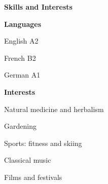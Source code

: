 \documentclass[a4paper,12pt,final]{memoir}
\newcommand{\Sep}{\vspace{1.5em}}
\newcommand{\SmallSep}{\vspace{0.5em}}
\newenvironment{Career Profile}
	{\ignorespaces\textbf{\color{ForestGreen} Career Profile}}
	{\Sep\ignorespacesafterend}
\newenvironment{Key experience}
	{\ignorespaces\textbf{\color{ForestGreen} Key experience}}
	{\Sep\ignorespacesafterend}
\newcommand{\CVSection}[1]
	{\Large\textbf{#1}\par
	\SmallSep\normalsize\normalfont}
\newcommand{\CVItem}[1]
	{\textbf{\color{ForestGreen} #1}}
\begin{document}
\CVSection{Skills and Interests}
\CVItem{Languages}
\begin{multicols}{3}
\begin{compactitem}[\color{ForestGreen}$\circ$]
	\item English A2
	\item French  B2
	\item German  A1
\end{compactitem}
\end{multicols}
\SmallSep

\CVItem{Interests}
\begin{multicols}{3}
\begin{compactitem}[\color{ForestGreen}$\circ$]
	\item Natural medicine and herbalism
	\item Gardening
	\item Sports: fitness and skiing 
	\item Classical music 
	\item Films and  festivals
\end{compactitem}
\end{multicols}
\Sep 



\end{document}
